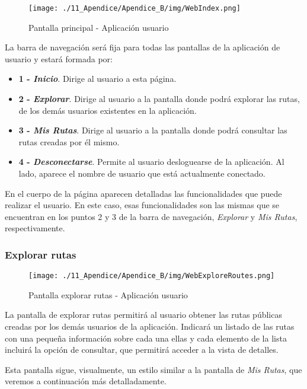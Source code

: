 \begin{figure}[H]
\centering
\texttt{[image: ./11\_Apendice/Apendice\_B/img/WebIndex.png]}
\caption{Pantalla principal - Aplicación usuario}
\end{figure}

La barra de navegación será fija para todas las pantallas de la aplicación de usuario y estará formada por:

\begin{itemize}
	\item \textbf{1 - \textit{Inicio}}. Dirige al usuario a esta página.
	\item \textbf{2 - \textit{Explorar}}. Dirige al usuario a la pantalla donde podrá explorar las rutas, de los demás usuarios existentes en la aplicación.
	\item \textbf{3 - \textit{Mis Rutas}}. Dirige al usuario a la pantalla donde podrá consultar las rutas creadas por él mismo.
	\item \textbf{4 - \textit{Desconectarse}}. Permite al usuario desloguearse de la aplicación. Al lado, aparece el nombre de usuario que está actualmente conectado.
\end{itemize}
	
	
En el cuerpo de la página aparecen detalladas las funcionalidades que puede realizar el usuario. En este caso, esas funcionalidades son las mismas que se encuentran en los puntos 2 y 3 de la barra de navegación, \textit{Explorar} y \textit{Mis Rutas}, respectivamente.


\subsubsection*{Explorar rutas}
\begin{figure}[H]
\centering
\texttt{[image: ./11\_Apendice/Apendice\_B/img/WebExploreRoutes.png]}
\caption{Pantalla explorar rutas - Aplicación usuario}
\end{figure}

La pantalla de explorar rutas permitirá al usuario obtener las rutas públicas creadas por los demás usuarios de la aplicación. Indicará un listado de las rutas con una pequeña información sobre cada una ellas y cada elemento de la lista incluirá la opción de consultar, que permitirá acceder a la vista de detalles. 

Esta pantalla sigue, visualmente, un estilo similar a la pantalla de \textit{Mis Rutas}, que veremos a continuación más detalladamente. 


